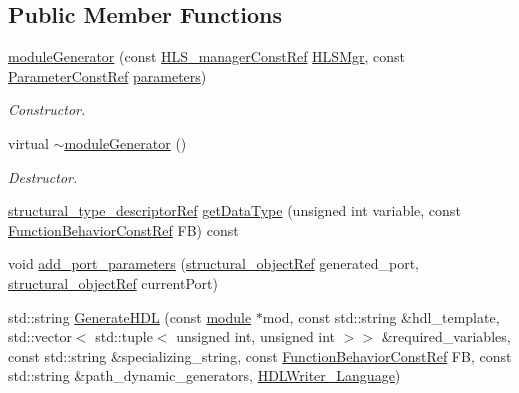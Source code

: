 \subsection*{Public Member Functions}
\begin{DoxyCompactItemize}
\item 
\hyperlink{classmoduleGenerator_a4b8eda51dd03d7cf90e378b10ee342e5}{module\+Generator} (const \hyperlink{hls__manager_8hpp_a1b481383e3beabc89bd7562ae672dd8c}{H\+L\+S\+\_\+manager\+Const\+Ref} \hyperlink{classmoduleGenerator_ae8926f8dbd7191f2990ec3eb0bf796fe}{H\+L\+S\+Mgr}, const \hyperlink{Parameter_8hpp_a37841774a6fcb479b597fdf8955eb4ea}{Parameter\+Const\+Ref} \hyperlink{classmoduleGenerator_a15185f847acfd4e34cda7af7fc772c02}{parameters})
\begin{DoxyCompactList}\small\item\em Constructor. \end{DoxyCompactList}\item 
virtual \hyperlink{classmoduleGenerator_a516f76a1ffc5455e691cd05c9569b590}{$\sim$module\+Generator} ()
\begin{DoxyCompactList}\small\item\em Destructor. \end{DoxyCompactList}\item 
\hyperlink{structural__objects_8hpp_a219296792577e3292783725961506c83}{structural\+\_\+type\+\_\+descriptor\+Ref} \hyperlink{classmoduleGenerator_a605b5c0840854b2854a3b966c23bd8ca}{get\+Data\+Type} (unsigned int variable, const \hyperlink{function__behavior_8hpp_a94872da12ed056b6ecf90456164e0213}{Function\+Behavior\+Const\+Ref} FB) const
\item 
void \hyperlink{classmoduleGenerator_a5dde4d1e5f2526b1fdd1edab7777a475}{add\+\_\+port\+\_\+parameters} (\hyperlink{structural__objects_8hpp_a8ea5f8cc50ab8f4c31e2751074ff60b2}{structural\+\_\+object\+Ref} generated\+\_\+port, \hyperlink{structural__objects_8hpp_a8ea5f8cc50ab8f4c31e2751074ff60b2}{structural\+\_\+object\+Ref} current\+Port)
\item 
std\+::string \hyperlink{classmoduleGenerator_a15676d465d1356f46bb9d60cfdb4e730}{Generate\+H\+DL} (const \hyperlink{classmodule}{module} $\ast$mod, const std\+::string \&hdl\+\_\+template, std\+::vector$<$ std\+::tuple$<$ unsigned int, unsigned int $>$$>$ \&required\+\_\+variables, const std\+::string \&specializing\+\_\+string, const \hyperlink{function__behavior_8hpp_a94872da12ed056b6ecf90456164e0213}{Function\+Behavior\+Const\+Ref} FB, const std\+::string \&path\+\_\+dynamic\+\_\+generators, \hyperlink{language__writer_8hpp_a890069761ca3ce361c42684c789d886c}{H\+D\+L\+Writer\+\_\+\+Language})
$$
\end{DoxyCompactItemize}
